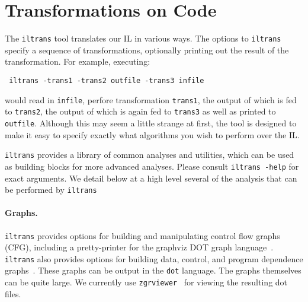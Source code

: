 \section{Transformations on \bil Code}
The {\tt iltrans} tool translates our IL in various ways.  The options
to {\tt iltrans} specify a sequence of transformations, optionally
printing out the result of the transformation.   For example,
executing:
\begin{verbatim}
 iltrans -trans1 -trans2 outfile -trans3 infile
\end{verbatim}
would read in {\tt infile}, perfore transformation {\tt trans1}, the
output of which is fed to {\tt trans2}, the output of which is again
fed to {\tt trans3} as well as printed to {\tt outfile}. Although this
may seem a little strange at first, the tool is designed to make it
easy to specify exactly what algorithms you wish to perform over the
IL.


{\tt iltrans} provides a library of common analyses and utilities,
which can be used as building blocks for more advanced analyses.
Please consult {\tt iltrans -help} for exact arguments.  We detail
below at a high level several of the analysis that can be performed by
{\tt iltrans}




\paragraph{Graphs.} {\tt iltrans} provides options for building and
manipulating control flow graphs (CFG), including a pretty-printer for
the graphviz DOT graph language~\cite{graphviz:dot}. {\tt iltrans}
also provides options for building data, control, and program
dependence graphs~\cite{muchnick:1997}.  These graphs can be output in
the {\tt dot} language.  The graphs themselves can be quite large.  We
currently use {\tt zgrviewer}~\cite{zgrviewer} for viewing the
resulting dot files.


